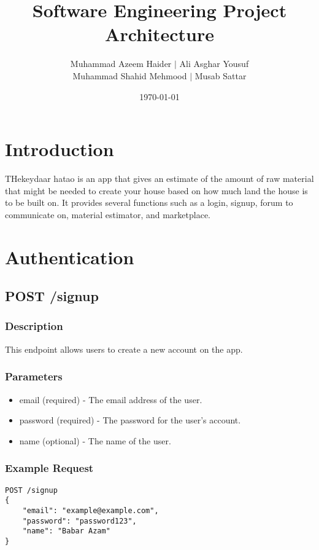 \documentclass{article}
\title{Software Engineering Project Architecture}
\author{Muhammad Azeem Haider $\mid$ Ali Asghar Yousuf \\
      Muhammad Shahid Mehmood $\mid$ Musab Sattar}
\date{\today}
\begin{document}
\maketitle

\section{Introduction}

THekeydaar hatao is an app that gives an estimate of the amount of raw material that might be needed to create your house based on how much land the house is to be built on. It provides several functions such as a login, signup, forum to communicate on, material estimator, and marketplace.

\section{Authentication}

\subsection{POST /signup}

\subsubsection{Description}

This endpoint allows users to create a new account on the app.

\subsubsection{Parameters}

\begin{itemize}
\item email (required) - The email address of the user.
\item password (required) - The password for the user's account.
\item name (optional) - The name of the user.
\end{itemize}

\subsubsection{Example Request}

\begin{verbatim}
POST /signup
{
    "email": "example@example.com",
    "password": "password123",
    "name": "Babar Azam"
}
\end{verbatim}
\end{document}
